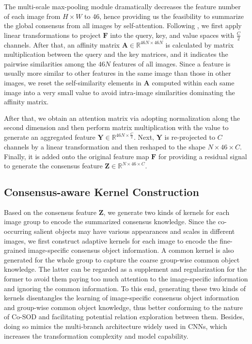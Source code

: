 \documentclass[10pt,twocolumn,letterpaper]{article}
\begin{document}
The multi-scale max-pooling module dramatically decreases the feature number of each image from $H\times W$ to 46, hence providing us the feasibility to summarize the global consensus from all images by self-attention.
Following \cite{vaswani2017attention}, we first apply linear transformations to project $\bm{F}$ into the query, key, and value spaces with $\frac{C}{2}$ channels. After that, an affinity matrix $\bm{A}\in{\mathbb{R}^{46N\times{46N}}}$ is calculated by matrix multiplication
between the query and the key matrices,
and it indicates the pairwise similarities among the $46N$ features of all images. Since a feature is usually more similar to other features in the same image than those in other images, we reset the self-similarity elements in $\bm{A}$ computed within each same image into a very small value to avoid intra-image similarities dominating the affinity matrix.

After that, we obtain an attention matrix via adopting normalization along the second dimension and then perform matrix multiplication with the value to generate an aggregated feature $\bm{Y}\in{\mathbb{R}^{46N\times{\frac{C}{2}}}}$.
Next, $\bm{Y}$ is re-projected to $C$ channels by a linear transformation and then reshaped to the shape $N\times{46\times C}$. Finally, it is added onto the original feature map $\bm{F}$ for providing a residual signal to generate the consensus feature $\bm{Z}\in{\mathbb{R}^{N\times{46\times C}}}$.

\subsection{Consensus-aware Kernel Construction}
Based on the consensus feature $\bm{Z}$, we generate two kinds of kernels for each image group to encode the summarized consensus knowledge. Since the co-occurring salient objects may have various appearances and scales in different images, we first construct adaptive kernels for each image to encode the fine-grained image-specific consensus object information. A common kernel is also generated for the whole group to capture the coarse group-wise common object knowledge. The latter can be regarded as a supplement and regularization for the former to avoid them paying too much attention to the image-specific information and ignoring the common information. To this end, generating these two kinds of kernels disentangles the learning of image-specific consensus object information and group-wise common object knowledge, thus better conforming to the nature of Co-SOD and facilitating potential relation exploration between them. Besides, doing so mimics the multi-branch architecture widely used in CNNs, which increases the transformation complexity and model capability.
\end{document}
